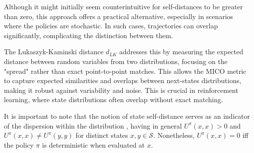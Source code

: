 

Although it might initially seem counterintuitive for self-distances to be greater than zero, this approach offers a practical alternative, especially in scenarios where the policies are stochastic. In such cases, trajectories can overlap significantly, complicating the distinction between them.

The Lukaszyk-Kaminski distance $d_{LK}$ addresses this by measuring the expected distance between random variables from two distributions, focusing on the "spread" rather than exact point-to-point matches. This allows the MICO metric to capture expected similarities and overlaps between next-states distributions, making it robust against variability and noise. This is crucial in reinforcement learning, where state distributions often overlap without exact matching.

It is important to note that the notion of state self-distance serves as an indicator of the dispersion within the distribution \cite{castro2021mico}, having in general $U^\pi(x,x) > 0$ and $U^\pi(x,x) \neq U^\pi(y,y)$ for distinct states $x, y \in \mathcal{S}$. Nonetheless, $U^\pi(x,x) =0$ iff the policy $\pi$ is deterministic when evaluated at $x$.

















